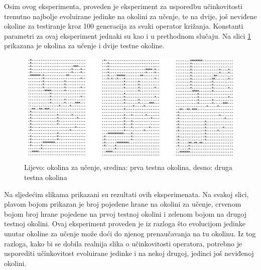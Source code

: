 Osim ovog eksperimenta, proveden je eksperiment za usporedbu učinkovitosti trenutno najbolje evoluirane jedinke na okolini za učenje, te na dvije, još neviđene okoline za testiranje kroz 100 generacija za svaki operator križanja. Konstanti parametri za ovaj eksperiment jednaki su kao i u prethodnom slučaju. Na slici \ref{trails} prikazana je okolina za učenje i dvije testne okoline.

\begin{figure}[H]
	\centering
	\includegraphics[scale=0.5]{./slike/cross-validation/trails.png}
	\caption{Lijevo: okolina za učenje, sredina: prva testna okolina, desno: druga testna okolina}
	\label{trails}
\end{figure}

Na sljedećim slikama prikazani su rezultati ovih eksperimenata. Na svakoj slici, plavom bojom prikazan je broj pojedene hrane na okolini za učenje, crvenom bojom broj hrane pojedene na prvoj testnoj okolini i zelenom bojom na drugoj testnoj okolini. Ovaj eksperiment proveden je iz razloga što evolucijom jedinke unutar okoline za učenje može doći do njenog prenaučavanja na tu okolinu. Iz tog razloga, kako bi se dobila realnija slika o učinkovitosti operatora, potrebno je usporediti učinkovitost evoluirane jedinke i na nekoj drugoj, jedinci još neviđenoj okolini.

